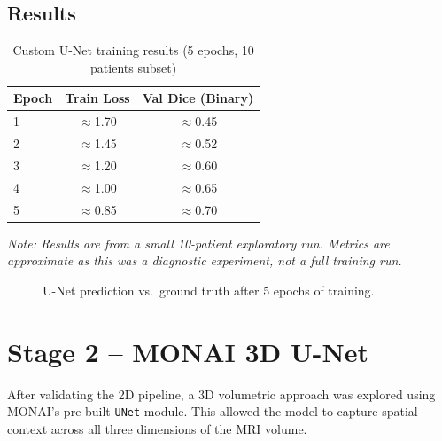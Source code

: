 \documentclass[12pt,a4paper]{report}
\begin{document}
\subsection{Results}

\begin{table}[H]
\centering
\caption{Custom U-Net training results (5 epochs, 10 patients subset)}
\label{tab:unet_results}
\begin{tabular}{lcc}
\toprule
\textbf{Epoch} & \textbf{Train Loss} & \textbf{Val Dice (Binary)} \\
\midrule
1 & $\approx$1.70 & $\approx$0.45 \\
2 & $\approx$1.45 & $\approx$0.52 \\
3 & $\approx$1.20 & $\approx$0.60 \\
4 & $\approx$1.00 & $\approx$0.65 \\
5 & $\approx$0.85 & $\approx$0.70 \\
\bottomrule
\end{tabular}
\end{table}

\noindent\textit{Note: Results are from a small 10-patient exploratory run. Metrics are approximate as this was a diagnostic experiment, not a full training run.}

\begin{figure}[H]
\centering
{}
\caption{U-Net prediction vs.\ ground truth after 5 epochs of training.}
\label{fig:unet_pred}
\end{figure}

\section{Stage 2 -- MONAI 3D U-Net}

After validating the 2D pipeline, a 3D volumetric approach was explored using MONAI's pre-built \texttt{UNet} module. This allowed the model to capture spatial context across all three dimensions of the MRI volume.
\end{document}
